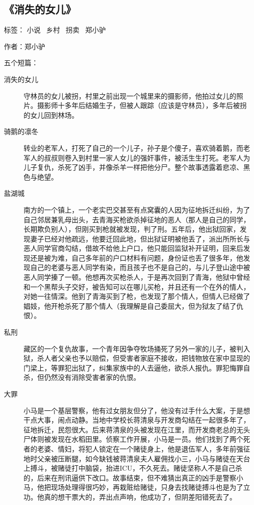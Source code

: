 \subsection{《消失的女儿》}

标签： 小说 \ 乡村 \ 拐卖 \ 郑小驴

作者：郑小驴

五个短篇：

\begin{description}
    \item[消失的女儿] 守林员的女儿被拐，村里之前出现一个城里来的摄影师，他拍过女儿的照片。摄影师十多年后结婚生子，但被人跟踪（应该是守林员），多年后被拐的女儿回到林场。
    \item[骑鹅的凛冬] 转业的老军人，打死了自己的一个儿子，孙子是个傻子，喜欢骑着鹅，而老军人的叔叔则卷入到村里一家人女儿的强奸事件，被活生生打死。老军人为儿子复仇，杀死了凶手，并像杀羊一样把他分尸。整个故事透露着悲凉、黑色与绝望。
    \item[盐湖城] 南方的一个镇上，一个老实巴交甚至有点窝囊的人因为征地拆迁纠纷，为了自己邻居兼乳母出头，去青海买枪欲杀掉征地的恶人（那人是自己的同学，长期欺负别人），但刚买到枪就被发现，判了刑。五年后，他出狱回家，发现妻子已经对他疏远，他要迁回此地，但出狱证明被他丢了，派出所所长与恶人同学官商勾结，借故不给他上户口，他只能回监狱补开证明，回来后发现还是被为难，自己多年前的户口材料有问题，身份证也丢了很多年，他发现自己的老婆与恶人同学有染，而且孩子也不是自己的，与儿子登山途中被恶人同学搸了一顿。他想再次买枪杀人，于是再次回到了青海，他狱中曾经和一个黑帮头子交好，被告知可以在哪儿买枪，并且还有一个在外的情人，对她一往情深。他到了青海买到了枪，也发现了那个情人，但情人已经做了娼妓，他开枪杀死了那个情人（我理解是自己委屈大，但为狱友了结了仇恨）。
    \item[私刑] 藏区的一个复仇故事，一个青年因争夺牧场捅死了另外一家的儿子，被判入狱，杀人者父亲也予以赔偿，但受害者家庭不接收，把钱物放在家中显现的门梁上，等罪犯出狱了，纠集家族中的人去逼他，欲杀人报仇。罪犯悔罪自杀，但仍然没有消除受害者家的仇恨。
    \item[大罪] 小马是一个基层警察，他有过女朋友但分了，他没有过手什么大案，于是想干点大事，闹点动静。当地中学校长蒋清泉与开发商勾结在一起很多年了，征地拆迁，民怨很大。后来蒋清泉的头被发现在江里，而开发商老总的无头尸体则被发现在水稻田里。侦察工作开展，小马是一员。他们找到了两个死者的老婆、情妇，将犯人锁定在一个赌徒身上，他是退伍军人，多年前强征地时父亲被压断腿，如今缺钱被蒋清泉夫人雇佣找小三，小马与赌徒在天台上搏斗，被赌徒打中脑袋，抬进ICU，不久死去。赌徒坚称人不是自己杀的，后来在刑讯逼供下改口。故事结束，但不难猜出真正的凶手是警察小马，他把现场处理得很巧妙，再栽赃给赌徒，只身去找赌徒搏斗也是为了立功。他真的想干票大的，弄出点声响，他成功了，但阴差阳错死去了。

\end{description}
